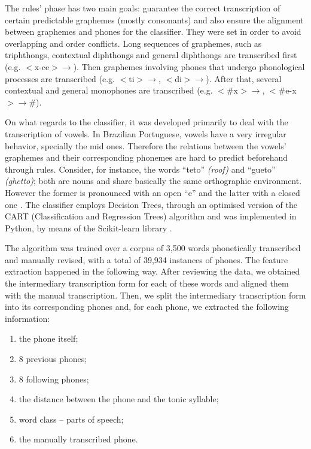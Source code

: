 The rules' phase has two main goals: guarantee the correct transcription of certain predictable graphemes (mostly consonants) and also ensure the alignment between graphemes and phones for the classifier. They were set in order to avoid overlapping and order conflicts. Long sequences of graphemes, such as triphthongs, contextual diphthongs and general diphthongs are transcribed first (e.g.  $<$x-ce$> \rightarrow $\textipa{[-se]}). Then graphemes involving phones that undergo phonological processes are transcribed (e.g. $<$ti$> \rightarrow $\textipa{[tSi]}, $<$di$> \rightarrow $\textipa{[dZi]}). After that, several contextual and general monophones are transcribed (e.g. $<$\#x$> \rightarrow $\textipa{[S]}, $<$\#e-x$> \rightarrow $\textipa{[}\#\textipa{e-z]}). 

On what regards to the classifier, it was developed primarily to deal with the transcription of vowels. In Brazilian Portuguese, vowels have a very irregular behavior, specially the mid ones. Therefore the relations between the vowels' graphemes and their corresponding phonemes are hard to predict beforehand through rules. Consider, for instance, the words ``teto'' \emph{(roof)} and ``gueto'' \emph{(ghetto)}; both are nouns and share basically the same orthographic environment. However the former is pronounced with an open ``e'' \textipa{["tE.tU]} and the latter with a closed one \textipa{["ge.tU]}. The classifier employs Decision Trees, through an optimised version of the CART (Classification and Regression Trees) algorithm and was implemented in Python, by means of the Scikit-learn library \cite{Scikit2011}. 

The algorithm was trained over a corpus of 3,500 words phonetically transcribed and manually revised, with a total of 39,934 instances of phones. The feature extraction happened in the following way. After reviewing the data, we obtained the intermediary transcription form for each of these words and aligned them with the manual transcription. Then, we split the intermediary transcription form into its corresponding phones and, for each phone, we extracted the following information: 

\begin{enumerate}
 \item the phone itself; 
 \item 8 previous phones; 
 \item 8 following phones; 
 \item the distance between the phone and the tonic syllable; 
 \item word class -- parts of speech; 
 \item the manually transcribed phone. 
\end{enumerate}

